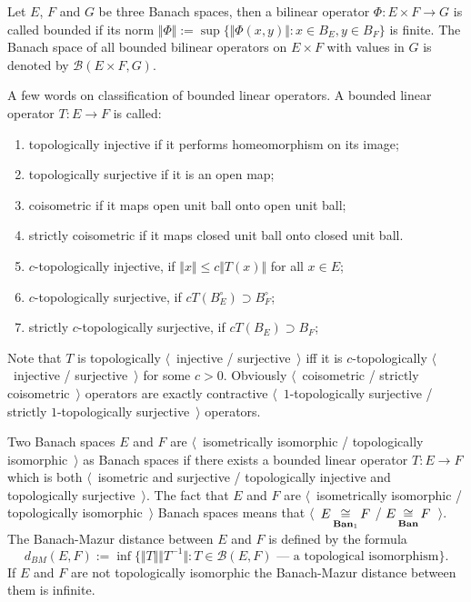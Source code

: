 Let $E$, $F$ and $G$ be three Banach spaces, then a bilinear operator
$\Phi:E\times F\to G$ is called bounded if its norm 
$\Vert \Phi\Vert:=\sup \{\Vert \Phi(x,y)\Vert:x\in B_E, y\in B_F \}$ is finite. 
The Banach space of all bounded bilinear operators on $E\times F$ with 
values in $G$ is denoted by $\mathcal{B}(E\times F,G)$.

A few words on classification of bounded linear operators. A bounded linear
operator $T:E\to F$ is called:
\begin{enumerate}[label = (\roman*)]
  \item topologically injective if it performs homeomorphism on its image;

  \item topologically surjective if it is an open map;

  \item coisometric if it maps open unit ball onto open unit ball;

  \item strictly coisometric if it maps closed unit ball onto closed unit ball. 

  \item $c$-topologically injective, if $\Vert x\Vert\leq c\Vert  T(x)\Vert$ for
  all $x\in E$;

  \item $c$-topologically surjective, if $cT(B_E^\circ)\supset B_F^\circ$;

  \item strictly $c$-topologically surjective, if $cT(B_E)\supset B_F$; 
\end{enumerate}

Note that $T$ is topologically $\langle$~injective / surjective~$\rangle$ iff it
is $c$-topologically $\langle$~injective / surjective~$\rangle$ for some $c>0$.
Obviously $\langle$~coisometric / strictly coisometric~$\rangle$ operators are
exactly contractive $\langle$~$1$-topologically surjective / strictly
$1$-topologically surjective~$\rangle$ operators.

Two Banach spaces $E$ and $F$ are $\langle$~isometrically isomorphic /
topologically isomorphic~$\rangle$ as Banach spaces if there exists a bounded
linear operator $T:E\to F$ which is both $\langle$~isometric and surjective /
topologically injective and topologically surjective~$\rangle$. The fact that
$E$ and $F$ are $\langle$~isometrically isomorphic / topologically
isomorphic~$\rangle$ Banach spaces means that
$\langle$~$E\mathop{\mathbin{\cong}}\limits_{\mathbf{Ban}_1}F$ / $E\mathop{\mathbin{\cong}}\limits_{\mathbf{Ban}}F$~$\rangle$. The
Banach-Mazur distance between $E$ and $F$ is defined by the formula 
$$
d_{BM}(E,F):=\inf \{
  \Vert T\Vert\Vert T^{-1}\Vert
  :T \in \mathcal{B}(E,F) \mbox{ --- a topological isomorphism}
 \}.
$$ 
If $E$ and $F$ are not topologically isomorphic the Banach-Mazur distance
between them is infinite.

